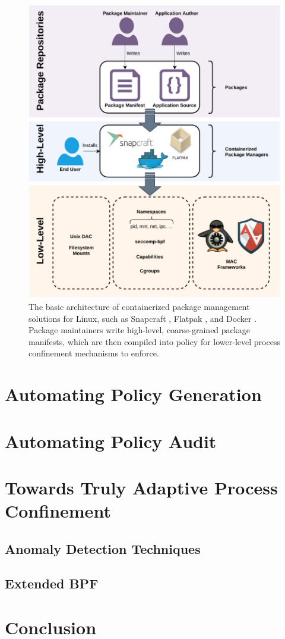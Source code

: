 \documentclass[dvipsnames, 12pt]{article}
\begin{document}
\begin{figure}[htpb]
    \centering
    \includegraphics[width=0.6\linewidth]{figs/high-level.pdf}
    \caption{
        The basic architecture of containerized package management solutions for
        Linux, such as Snapcraft \cite{snap}, Flatpak \cite{flatpak}, and Docker
        \cite{docker}. Package maintainers write high-level, coarse-grained
        package manifests, which are then compiled into policy for lower-level
        process confinement mechanisms to enforce.
    }%
    \label{fig:containerized}
\end{figure}

\section{Automating Policy Generation}
\label{sec:automating_generation}

\section{Automating Policy Audit}
\label{sec:automating_audit}

\section{Towards Truly Adaptive Process Confinement}
\label{sec:towards}

\subsection{Anomaly Detection Techniques}

\subsection{Extended BPF}

\section{Conclusion}
\label{sec:conclusion}


\nocite{*} %
\clearpage
\printbibliography
\end{document}
